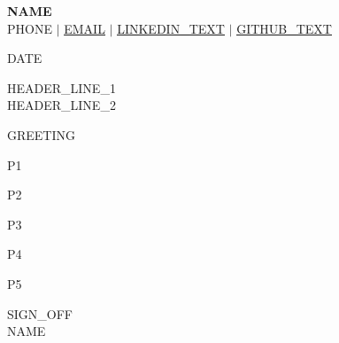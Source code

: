 \documentclass[letterpaper,11pt]{article}
\begin{document}
\begin{center}
    \textbf{\Huge \scshape {{NAME}}} \\ \vspace{1pt}
    \small {{PHONE}} $|$ \href{mailto:{{EMAIL}}}{\underline{{{EMAIL}}}} $|$
    \href{{{LINKEDIN_URL}}}{\underline{{{LINKEDIN_TEXT}}}} $|$
    \href{{{GITHUB_URL}}}{\underline{{{GITHUB_TEXT}}}}
\end{center}
\vspace{4pt}

{{DATE}}

{{HEADER_LINE_1}} \\
{{HEADER_LINE_2}}

{{GREETING}}

{{P1}}

{{P2}}

{{P3}}

{{P4}}

{{P5}}

{{SIGN_OFF}} \\
{{NAME}}
\end{document}
